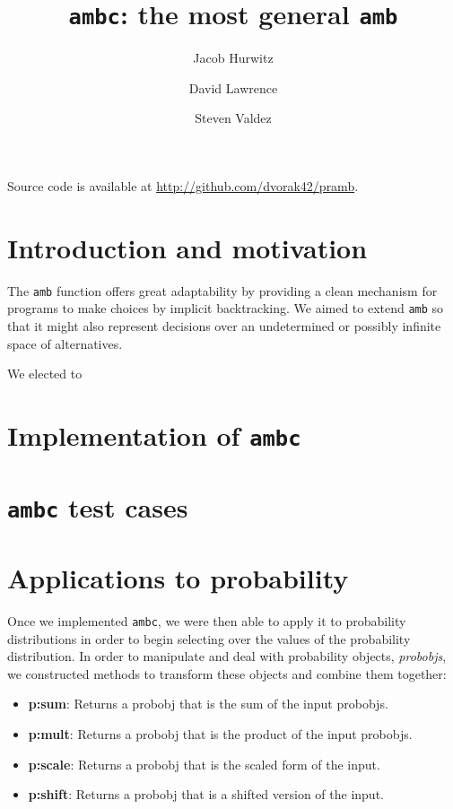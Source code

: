 \documentclass{article}
\title{\texttt{ambc}: the most general \texttt{amb}}
\author{Jacob Hurwitz \and David Lawrence \and Steven Valdez}
\begin{document}
\maketitle

\begin{center}
  Source code is available at \url{http://github.com/dvorak42/pramb}.
\end{center}

\section{Introduction and motivation}

The \texttt{amb} function offers great adaptability by providing a
clean mechanism for programs to make choices by implicit backtracking.
We aimed to extend \texttt{amb} so that it might also represent
decisions over an undetermined or possibly infinite space of
alternatives.

We elected to 

\section{Implementation of \texttt{ambc}}

\section{\texttt{ambc} test cases}

\section{Applications to probability}
Once we implemented \texttt{ambc}, we were then able to apply it to probability
distributions in order to begin selecting over the values of the probability
distribution. In order to manipulate and deal with probability objects,
\textit{probobjs}, we constructed methods to transform these objects and combine
them together:

\begin{itemize}
  \item \textbf{p:sum}: Returns a probobj that is the sum of the input probobjs.
  \item \textbf{p:mult}: Returns a probobj that is the product of the input probobjs.
  \item \textbf{p:scale}: Returns a probobj that is the scaled form of the input.
  \item \textbf{p:shift}: Returns a probobj that is a shifted version of the
    input.
\end{itemize}
\end{document}
